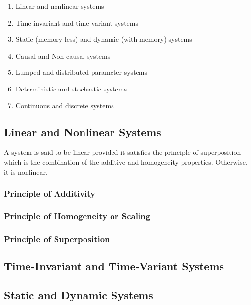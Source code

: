 \documentclass[
  14pt,
  a4paper,
  oneside,
  open=any,
  a4paper,
  14pt]{report}
\providecommand{\tightlist}{%
  \setlength{\itemsep}{0pt}\setlength{\parskip}{0pt}}\usepackage{longtable,booktabs,array}
\begin{document}
\begin{enumerate}
\def\labelenumi{\arabic{enumi}.}
\tightlist
\item
  Linear and nonlinear systems
\item
  Time-invariant and time-variant systems
\item
  Static (memory-less) and dynamic (with memory) systems
\item
  Causal and Non-causal systems
\item
  Lumped and distributed parameter systems
\item
  Deterministic and stochastic systems
\item
  Continuous and discrete systems
\end{enumerate}

\subsection{Linear and Nonlinear
Systems}\label{linear-and-nonlinear-systems}

A system is said to be linear provided it satisfies the principle of
superposition which is the combination of the additive and homogeneity
properties. Otherwise, it is nonlinear.

\subsubsection{Principle of Additivity}\label{principle-of-additivity}

\subsubsection{Principle of Homogeneity or
Scaling}\label{principle-of-homogeneity-or-scaling}

\subsubsection{Principle of
Superposition}\label{principle-of-superposition}

\subsection{Time-Invariant and Time-Variant
Systems}\label{time-invariant-and-time-variant-systems}

\subsection{Static and Dynamic
Systems}\label{static-and-dynamic-systems}
\end{document}
